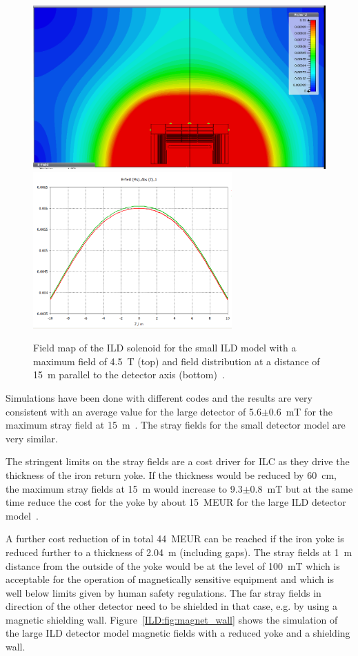 \begin{figure}[h!]
    \centering
    \includegraphics[width=0.8\hsize]{Integration/fig/strayfield_small_4_5.png}
    \includegraphics[width=0.8\hsize, height =6cm]{Integration/fig/strayfield_small_4_5_plot.png}
    \caption{Field map of the ILD solenoid for the small ILD model with a maximum field of 4.5~T (top) and field distribution at a distance of 15~m parallel to the detector axis (bottom)~\cite{ild:bib:Magnet_Simulations}.}
    \label{ILD:fig:magnet_small_stray}
\end{figure}
Simulations have been done with different codes and the results are very consistent with an average value for the large detector of 5.6$\pm$0.6~mT for the maximum stray field at 15~m~\cite{ild:bib:Magnet_Simulations}. The stray fields for the small detector model are very similar. 

The stringent limits on the stray fields are a cost driver for ILC as they drive the thickness of the iron return yoke. If the thickness would be reduced by 60~cm, the maximum stray fields at 15~m would increase to 9.3$\pm$0.8~mT but at the same time reduce the cost for the yoke by about 15~MEUR for the large ILD detector model~\cite{ild:bib:Magnet_Simulations}.

A further cost reduction of in total 44~MEUR can be reached if the iron yoke is reduced further to a thickness of 2.04~m (including gaps). The stray fields at 1~m distance from the outside of the yoke would be at the level of 100~mT which is acceptable for the operation of magnetically sensitive equipment and which is well below limits given by human safety regulations. The far stray fields in direction of the other detector need to be shielded in that case, e.g. by using a magnetic shielding wall. Figure~\ref{ILD:fig:magnet_wall} shows the simulation of the large ILD detector model magnetic fields with a reduced yoke and a shielding wall.

